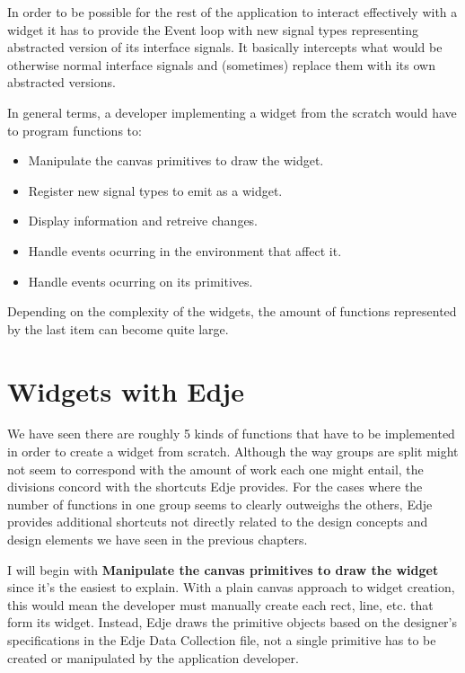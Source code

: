 \documentclass[12pt,a4paper,english]{book}
\begin{document}
In order to be possible for the rest of the application to interact effectively
with a widget it has to provide the Event loop with new signal types
representing abstracted version of its interface signals. It basically
intercepts what would be otherwise normal interface signals and (sometimes)
replace them with its own abstracted versions.

In general terms, a developer implementing a widget from the scratch would have
to program functions to:
\begin{itemize}
\item {} 
Manipulate the canvas primitives to draw the widget.

\item {} 
Register new signal types to emit as a widget.

\item {} 
Display information and retreive changes.

\item {} 
Handle events ocurring in the environment that affect it.

\item {} 
Handle events ocurring on its primitives.

\end{itemize}

Depending on the complexity of the widgets, the amount of functions represented
by the last item can become quite large.



\hypertarget{widgets-with-edje}{}
\section{Widgets with Edje}

We have seen there are roughly 5 kinds of functions that have to be implemented
in order to create a widget from scratch. Although the way groups are split
might not seem to correspond with the amount of work each one might entail, the
divisions concord with the shortcuts Edje provides. For the cases where
the number of functions in one group seems to clearly outweighs the others,
Edje provides additional shortcuts not directly related to the design concepts
and design elements we have seen in the previous chapters.

I will begin with \textbf{Manipulate the canvas primitives to draw the widget} since
it's the easiest to explain. With a plain canvas approach to widget creation,
this would mean the developer must manually create each rect, line, etc. that
form its widget. Instead, Edje draws the primitive objects based on the
designer's  specifications in the Edje Data Collection file, not a single
primitive has to be created or manipulated by the application developer.
\end{document}
